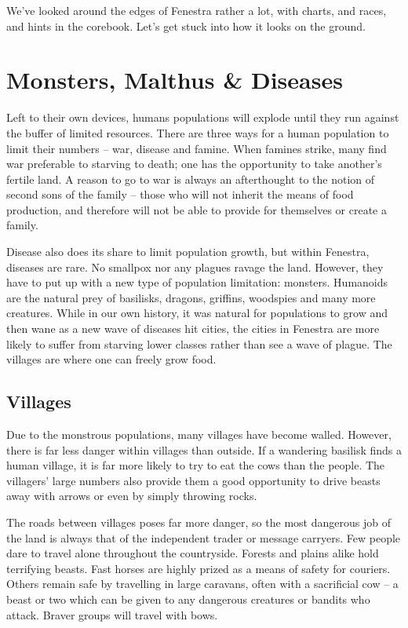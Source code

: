 We've looked around the edges of Fenestra rather a lot, with charts, and races, and hints in the corebook.  Let's get stuck into how it looks on the ground.

\section{Monsters, Malthus \& Diseases}

\begin{multicols}{2}

Left to their own devices, humans populations will explode until they run against the buffer of limited resources.  There are three ways for a human population to limit their numbers -- war, disease and famine.  When famines strike, many find war preferable to starving to death; one has the opportunity to take another's fertile land.  A reason to go to war is always an afterthought to the notion of second sons of the family -- those who will not inherit the means of food production, and therefore will not be able to provide for themselves or create a family.

Disease also does its share to limit population growth, but within Fenestra, diseases are rare.  No smallpox nor any plagues ravage the land.  However, they have to put up with a new type of population limitation: monsters.  Humanoids are the natural prey of basilisks, dragons, griffins, woodspies and many more creatures.  While in our own history, it was natural for populations to grow and then wane as a new wave of diseases hit cities, the cities in Fenestra are more likely to suffer from starving lower classes rather than see a wave of plague.  The villages are where one can freely grow food.

\subsection{Villages}

Due to the monstrous populations, many villages have become walled.  However, there is far less danger within villages than outside.  If a wandering basilisk finds a human village, it is far more likely to try to eat the cows than the people.  The villagers' large numbers also provide them a good opportunity to drive beasts away with arrows or even by simply throwing rocks.

The roads between villages poses far more danger, so the most dangerous job of the land is always that of the independent trader or message carryers.  Few people dare to travel alone throughout the countryside.
Forests and plains alike hold terrifying beasts.  Fast horses are highly prized as a means of safety for couriers.  Others remain safe by travelling in large caravans, often with a sacrificial cow -- a beast or two which can be given to any dangerous creatures or bandits who attack.  Braver groups will travel with bows.


\end{multicols}
